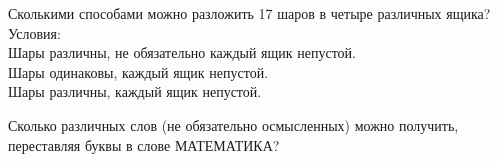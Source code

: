 %
%



\begin{problems}

\item
Сколькими способами можно разложить 17 шаров в четыре различных ящика?
Условия:
\\
\sbp Шары различны, не обязательно каждый ящик непустой.
\\
\sbp Шары одинаковы, каждый ящик непустой.
\\
\sbp Шары различны, каждый ящик непустой.

\item
Сколько различных слов (не обязательно осмысленных) можно получить, переставляя
буквы в слове МАТЕМАТИКА?


\end{problems}

